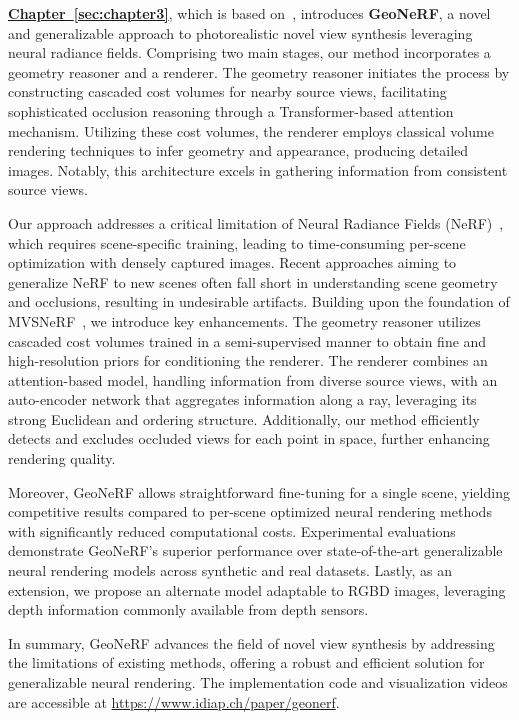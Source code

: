\textbf{\hyperref[sec:chapter3]{Chapter~\ref{sec:chapter3}}}, which is based on~\cite{johari2022geonerf}, introduces \textbf{GeoNeRF}, a novel and generalizable approach to photorealistic novel view synthesis leveraging neural radiance fields. Comprising two main stages, our method incorporates a geometry reasoner and a renderer. The geometry reasoner initiates the process by constructing cascaded cost volumes for nearby source views, facilitating sophisticated occlusion reasoning through a Transformer-based attention mechanism. Utilizing these cost volumes, the renderer employs classical volume rendering techniques to infer geometry and appearance, producing detailed images. Notably, this architecture excels in gathering information from consistent source views.

Our approach addresses a critical limitation of Neural Radiance Fields (NeRF)~\citep{mildenhall2020nerf}, which requires scene-specific training, leading to time-consuming per-scene optimization with densely captured images. Recent approaches aiming to generalize NeRF to new scenes often fall short in understanding scene geometry and occlusions, resulting in undesirable artifacts. Building upon the foundation of MVSNeRF~\citep{chen2021mvsnerf}, we introduce key enhancements. The geometry reasoner utilizes cascaded cost volumes trained in a semi-supervised manner to obtain fine and high-resolution priors for conditioning the renderer. The renderer combines an attention-based model, handling information from diverse source views, with an auto-encoder network that aggregates information along a ray, leveraging its strong Euclidean and ordering structure. Additionally, our method efficiently detects and excludes occluded views for each point in space, further enhancing rendering quality.

Moreover, GeoNeRF allows straightforward fine-tuning for a single scene, yielding competitive results compared to per-scene optimized neural rendering methods with significantly reduced computational costs. Experimental evaluations demonstrate GeoNeRF's superior performance over state-of-the-art generalizable neural rendering models across synthetic and real datasets. Lastly, as an extension, we propose an alternate model adaptable to RGBD images, leveraging depth information commonly available from depth sensors.

In summary, GeoNeRF advances the field of novel view synthesis by addressing the limitations of existing methods, offering a robust and efficient solution for generalizable neural rendering. The implementation code and visualization videos are accessible at \href{https://www.idiap.ch/paper/geonerf}{https://www.idiap.ch/paper/geonerf}.


